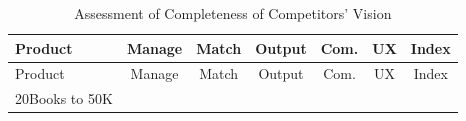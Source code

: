 \documentclass[11pt,openany]{book}
\begin{document}
\begin{longtable}[]{@{}lcccccc@{}}
\caption{Assessment of Completeness of Competitors'
Vision}\tabularnewline
\toprule
\begin{minipage}[b]{0.29\columnwidth}\raggedright
Product\strut
\end{minipage} & \begin{minipage}[b]{0.09\columnwidth}\centering
Manage\strut
\end{minipage} & \begin{minipage}[b]{0.08\columnwidth}\centering
Match\strut
\end{minipage} & \begin{minipage}[b]{0.09\columnwidth}\centering
Output\strut
\end{minipage} & \begin{minipage}[b]{0.07\columnwidth}\centering
Com.\strut
\end{minipage} & \begin{minipage}[b]{0.10\columnwidth}\centering
UX\strut
\end{minipage} & \begin{minipage}[b]{0.10\columnwidth}\centering
Index\strut
\end{minipage}\tabularnewline
\midrule
\endfirsthead
\toprule
\begin{minipage}[b]{0.29\columnwidth}\raggedright
Product\strut
\end{minipage} & \begin{minipage}[b]{0.09\columnwidth}\centering
Manage\strut
\end{minipage} & \begin{minipage}[b]{0.08\columnwidth}\centering
Match\strut
\end{minipage} & \begin{minipage}[b]{0.09\columnwidth}\centering
Output\strut
\end{minipage} & \begin{minipage}[b]{0.07\columnwidth}\centering
Com.\strut
\end{minipage} & \begin{minipage}[b]{0.10\columnwidth}\centering
UX\strut
\end{minipage} & \begin{minipage}[b]{0.10\columnwidth}\centering
Index\strut
\end{minipage}\tabularnewline
\midrule
\endhead
\begin{minipage}[t]{0.29\columnwidth}\raggedright
20Books to 50K\strut
\end{minipage} & \begin{minipage}[t]{0.09\columnwidth}\centering

\end{minipage}
\end{longtable}
\end{document}
